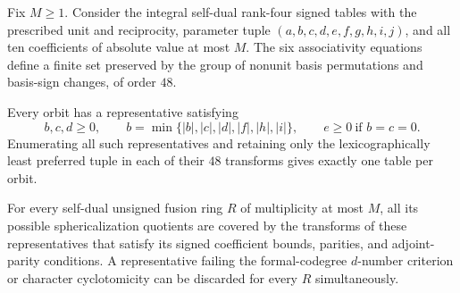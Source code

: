 \begin{proposition}
\label{finite:prop:global-signed-cover}
Fix $M\geq1$. Consider the integral self-dual rank-four signed tables
with the prescribed unit and reciprocity, parameter tuple
$(a,b,c,d,e,f,g,h,i,j)$, and all ten coefficients of absolute value
at most $M$. The six associativity equations define a finite set
preserved by the group of nonunit basis permutations and basis-sign
changes, of order $48$.

Every orbit has a representative satisfying
\[
 b,c,d\geq0,\qquad
 b=\min\{|b|,|c|,|d|,|f|,|h|,|i|\},
 \qquad e\geq0\ \text{if }b=c=0.
\]
Enumerating all such representatives and retaining only the
lexicographically least preferred tuple in each of their $48$
transforms gives exactly one table per orbit.

For every self-dual unsigned fusion ring $R$ of multiplicity at
most $M$, all its possible sphericalization quotients are covered
by the transforms of these representatives that satisfy its signed
coefficient bounds, parities, and adjoint-parity conditions.
A representative failing the formal-codegree $d$-number criterion
or character cyclotomicity can be discarded for every $R$
simultaneously.
\end{proposition}
